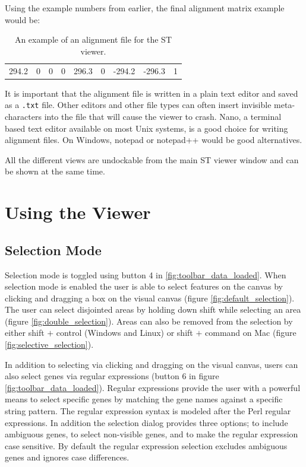 \documentclass[10pt,a4paper,titlepage]{book}
\begin{document}
Using the example numbers from earlier, the final alignment matrix example would be:

\begin{table}[h]
\begin{center}
\caption{An example of an alignment file for the ST viewer.}
\begin{tabular}{*{9}{c}}
294.2 & 0 & 0 & 0 & 296.3 & 0 & -294.2 & -296.3 & 1 \\
\end{tabular}
\label{tab:st_viewer_alignment_example}
\end{center}
\end{table}

It is important that the alignment file is written in a plain text editor and saved as a \texttt{.txt} file. Other editors and other file types can often insert invisible meta-characters into the file that will cause the viewer to crash. Nano, a terminal based text editor available on most Unix systems, is a good choice for writing alignment files. On Windows, notepad or notepad++ would be good alternatives.

All the different views are undockable from the main ST viewer window and can be shown at the same time.

\chapter{Using the Viewer}
\label{ch:selection}

\section{Selection Mode}
Selection mode is toggled using button 4 in \ref{fig:toolbar_data_loaded}. When selection mode is enabled the user is able to select features on the canvas by clicking and dragging a box on the visual canvas (figure \ref{fig:default_selection}). The user can select disjointed areas by holding down shift while selecting an area (figure \ref{fig:double_selection}). Areas can also be removed from the selection by either shift $+$ control (Windows and Linux) or shift $+$ command on Mac (figure \ref{fig:selective_selection}).

In addition to selecting via clicking and dragging on the visual canvas, users can also select genes via regular expressions (button 6 in figure \ref{fig:toolbar_data_loaded}). Regular expressions provide the user with a powerful means to select specific genes by matching the gene names against a specific string pattern. The regular expression syntax is modeled after the Perl regular expressions.
In addition the selection dialog provides three options; to include ambiguous genes, to select non-visible genes, and to make the regular expression case sensitive.
By default the regular expression selection excludes ambiguous genes and ignores case differences.
\end{document}
